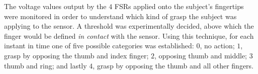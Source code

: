 The voltage values output by the $4$ FSRs applied onto the subject's
fingertips were monitored in order to understand which kind of grasp
the subject was applying to the sensor. A threshold was experimentally
decided, above which the finger would be defined \emph{in contact}
with the sensor. Using this technique, for each instant in time one of
five possible categories was established: $0$, no action; $1$, grasp
by opposing the thumb and index finger; $2$, opposing thumb and
middle; $3$ thumb and ring; and lastly $4$, grasp by opposing the
thumb and all other fingers.
%

%
